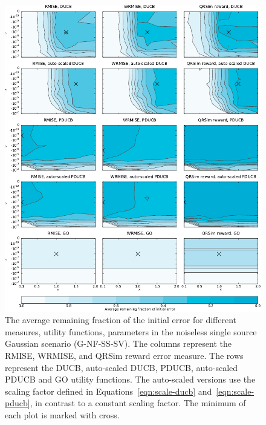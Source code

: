 \begin{figure}
    \centering
    \includegraphics{plots/psearch-G-NF-SS-SV}
    \caption[Remaining fraction of the initial error (G-NF-SS-SV)]{The average 
        remaining fraction of the initial error for different measures, utility 
        functions, parameters in the noiseless single source Gaussian scenario 
        (G-NF-SS-SV).  The columns represent the RMISE, WRMISE, and QRSim reward 
        error measure.  The rows represent the DUCB, auto-scaled DUCB, PDUCB, 
        auto-scaled PDUCB and GO utility functions. The auto-scaled versions use 
        the scaling factor defined in Equations~\ref{eqn:scale-ducb} 
        and~\ref{eqn:scale-pducb}, in contrast to a constant scaling factor. The 
        minimum of each plot is marked with 
        cross.}\label{fig:psearch-G-NF-SS-SV}
\end{figure}
